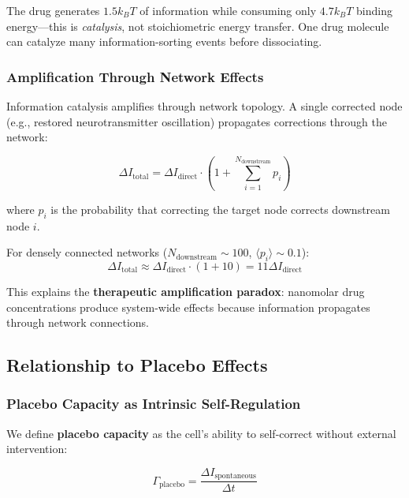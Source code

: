 \documentclass{article}
\begin{document}
The drug generates $1.5 k_B T$ of information while consuming only $4.7 k_B T$ binding energy—this is \textit{catalysis}, not stoichiometric energy transfer. One drug molecule can catalyze many information-sorting events before dissociating.

\subsubsection{Amplification Through Network Effects}

Information catalysis amplifies through network topology. A single corrected node (e.g., restored neurotransmitter oscillation) propagates corrections through the network:

\begin{equation}
\Delta I_{\text{total}} = \Delta I_{\text{direct}} \cdot \left(1 + \sum_{i=1}^{N_{\text{downstream}}} p_i\right)
\end{equation}

where $p_i$ is the probability that correcting the target node corrects downstream node $i$.

For densely connected networks ($N_{\text{downstream}} \sim 100$, $\langle p_i \rangle \sim 0.1$):
\begin{equation}
\Delta I_{\text{total}} \approx \Delta I_{\text{direct}} \cdot (1 + 10) = 11 \Delta I_{\text{direct}}
\end{equation}

This explains the \textbf{therapeutic amplification paradox}: nanomolar drug concentrations produce system-wide effects because information propagates through network connections.

\subsection{Relationship to Placebo Effects}

\subsubsection{Placebo Capacity as Intrinsic Self-Regulation}

We define \textbf{placebo capacity} as the cell's ability to self-correct without external intervention:

\begin{equation}
\Gamma_{\text{placebo}} = \frac{\Delta I_{\text{spontaneous}}}{\Delta t}
\end{equation}
\end{document}
